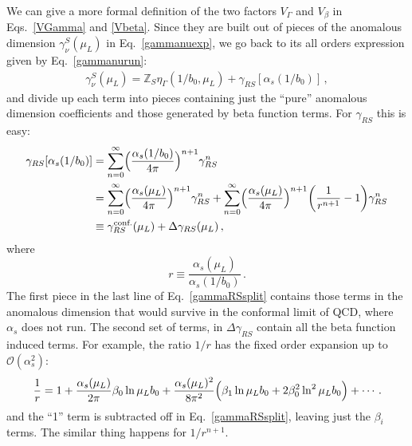 \documentclass[a4,letterpaper,11pt]{article}
\newcommand{\nn}{\nonumber}
\newcommand{\be}{\begin{equation}}
\newcommand{\ee}{\end{equation}}
\newcommand{\as}{\alpha_s}
\newcommand{\cO}{\mathcal{O}}
\newcommand{\zed}{\mathbb{Z}}
\newcommand{\eq}[1]{Eq.~\eqref{#1}}
\newcommand{\eqs}[2]{Eqs.~\eqref{#1} and \eqref{#2}}
\begin{document}
We can give a more formal definition of the two factors $V_\Gamma$ and $V_\beta$ in \eqs{VGamma}{Vbeta}. Since they are built out of pieces of the anomalous dimension $\gamma_\nu^S(\mu_L)$ in \eq{gammanuexp}, we go back to its all orders expression given by \eq{gammanurun}:
\begin{align}
\gamma_\nu^{S}(\mu_L) = \zed_S \eta_\Gamma(1/b_0,\mu_L) + \gamma_{RS}[\as(1/b_0)]\,,
\end{align}
and divide up each term into pieces containing just the ``pure'' anomalous dimension coefficients and those generated by beta function terms. For $\gamma_{RS}$ this is easy:
\begin{align}
\label{gammaRSsplit}
\gamma_{RS}[\as(1/b_0)] &= \sum_{n=0}^\infty \Bigl(\frac{\as(1/b_0)}{4\pi}\Bigr)^{n+1} \gamma_{RS}^n \\
&= \sum_{n=0}^\infty \Bigl(\frac{\as(\mu_L)}{4\pi}\Bigr)^{n+1} \gamma_{RS}^n + \sum_{n=0}^\infty \Bigl(\frac{\as(\mu_L)}{4\pi}\Bigr)^{n+1}\biggl(\frac{1}{r^{n+1}} - 1\biggr) \gamma_{RS}^n \nn \\
&\equiv \gamma_{RS}^{\text{conf.}}(\mu_L) + \Delta\gamma_{RS}(\mu_L)\,, \nn
\end{align}
where 
\be
r\equiv \frac{\as(\mu_L)}{\as(1/b_0)}\,.
\ee
The first piece in the last line of \eq{gammaRSsplit} contains those terms in the anomalous dimension that would survive in the conformal limit of QCD, where $\as$ does not run. The second set of terms, in $\Delta\gamma_{RS}$ contain all the beta function induced terms. For example, the ratio $1/r$ has the fixed order expansion up to $\cO(\as^2)$:
\be
\frac{1}{r} = 1 + \frac{\as(\mu_L)}{2\pi}\beta_0 \ln \mu_L b_0 + \frac{\as(\mu_L)^2}{8\pi^2} \Bigl( \beta_1 \ln\mu_L b_0 + 2\beta_0^2 \ln^2\mu_L b_0\Bigr) + \cdots\,.
\ee
and the ``1'' term is subtracted off in \eq{gammaRSsplit}, leaving just the $\beta_i$ terms. The similar thing happens for $1/r^{n+1}$.
\end{document}
